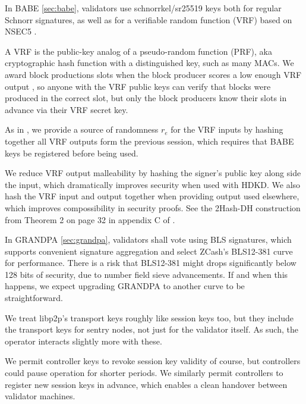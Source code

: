 In BABE \ref{sec:babe}, validators use schnorrkel/sr25519 keys both for regular Schnorr signatures, as well as for a verifiable random function (VRF) based on NSEC5 \cite{NSEC5}.  

A VRF is the public-key analog of a pseudo-random function (PRF), aka cryptographic hash function with a distinguished key, such as many MACs.  We award block productions slots when the block producer scores a low enough VRF output , so anyone with the VRF public keys can verify that blocks were produced in the correct slot, but only the block producers know their slots in advance via their VRF secret key.

As in \cite{Praos}, we provide a source of randomness $r_e$ for the VRF inputs by hashing together all VRF outputs form the previous session, which requires that BABE keys be registered  before being used.

We reduce VRF output malleability by hashing the signer's public key along side the input, which dramatically improves security when used with HDKD.  We also hash the VRF input and output together when providing output used elsewhere, which improves compossibility in security proofs. See the 2Hash-DH construction from Theorem 2 on page 32 in appendix C of \cite{Praos}.  

In GRANDPA \ref{sec:grandpa}, validators shall vote using BLS signatures, which supports convenient signature aggregation and select ZCash's BLS12-381 curve for performance.  There is a risk that BLS12-381 might drops significantly below 128 bits of security, due to number field sieve advancements.  If and when this happens, we expect upgrading GRANDPA to another curve to be straightforward. 


We treat libp2p's transport keys roughly like session keys too, but they include the transport keys for sentry nodes, not just for the validator itself.  As such, the operator interacts slightly more with these.

We permit controller keys to revoke session key validity of course, but controllers could pause operation for shorter periods.  We similarly permit controllers to register new session keys in advance, which enables a clean handover between validator machines.


